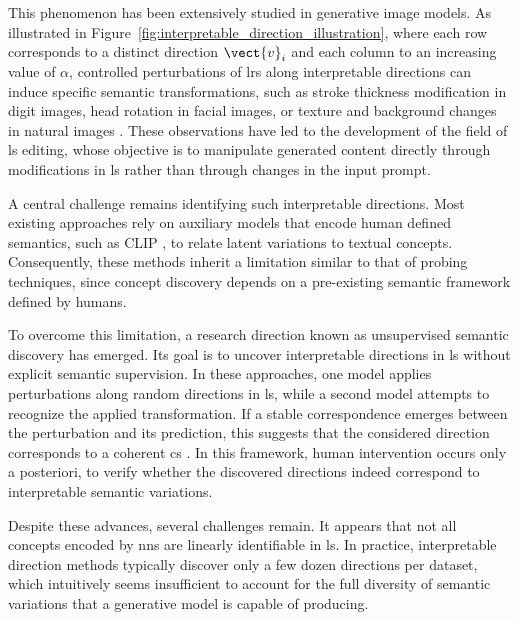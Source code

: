 

This phenomenon has been extensively studied in generative image models.
As illustrated in Figure~\ref{fig:interpretable_direction_illustration}, where each row corresponds to a distinct direction $\vect{v}_i$ and each column to an increasing value of $\alpha$, controlled perturbations of \glspl{lr} along interpretable directions can induce specific semantic transformations, such as stroke thickness modification in digit images, head rotation in facial images, or texture and background changes in natural images \parencite{voynov2020unsuperviseddiscoveryinterpretabledirections}.
These observations have led to the development of the field of \gls{ls} editing, whose objective is to manipulate generated content directly through modifications in \gls{ls} rather than through changes in the input prompt.



A central challenge remains identifying such interpretable directions.
Most existing approaches rely on auxiliary models that encode human defined semantics, such as CLIP \parencite{haas2024discovering}, to relate latent variations to textual concepts.
Consequently, these methods inherit a limitation similar to that of probing techniques, since concept discovery depends on a pre-existing semantic framework defined by humans.

To overcome this limitation, a research direction known as unsupervised semantic discovery has emerged.
Its goal is to uncover interpretable directions in \gls{ls} without explicit semantic supervision.
In these approaches, one model applies perturbations along random directions in \gls{ls}, while a second model attempts to recognize the applied transformation.
If a stable correspondence emerges between the perturbation and its prediction, this suggests that the considered direction corresponds to a coherent \gls{cs} \parencite{voynov2020unsuperviseddiscoveryinterpretabledirections}.
In this framework, human intervention occurs only a posteriori, to verify whether the discovered directions indeed correspond to interpretable semantic variations.

Despite these advances, several challenges remain.
It appears that not all concepts encoded by \glspl{nn} are linearly identifiable in \gls{ls}.
In practice, interpretable direction methods typically discover only a few dozen directions per dataset, which intuitively seems insufficient to account for the full diversity of semantic variations that a generative model is capable of producing.

